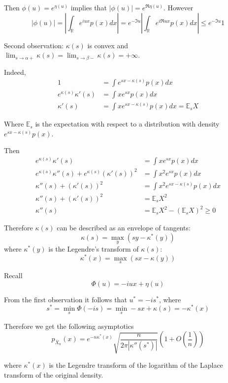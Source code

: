 \documentclass[a4paper]{article}
\newcommand{\brac}[1]{{\left ( #1 \right )}}
\newcommand{\abs}[1]{{\left | #1 \right |}}
\newcommand{\Real}{\mathbb{R}}
\newcommand{\ex}{\mathbb{E}}
\begin{document}
Then $\phi(u) = e^{\eta(u)}$ implies that $\abs{\phi(u)} = e^{\Re \eta(u)}$. However 
\[\abs{\phi(u)} = \abs{\int_\Real e^{iux} p(x) dx} = e^{-\Im u} \abs{ \int_\Real e^{i\Re u x} p(x) dx } \leq e^{-\Im u} 1 \]

Second observation: $\kappa(s)$ is convex and $\lim_{s\to \alpha+} \kappa(s) = \lim_{s\to \beta-} \kappa(s) = +\infty$.

Indeed, 
\begin{align*}
	1 &= \int e^{sx - \kappa(s)} p(x) dx \\
	e^{\kappa(s)} \kappa'(s) &= \int xe^{sx} p(x) dx \\
	\kappa'(s) &= \int xe^{sx - \kappa(s)} p(x) dx = \ex_s X
\end{align*}

Where $\ex_s$ is the expectation with respect to a distribution with density $e^{sx - \kappa(s)} p(x)$.

Then
\begin{align*}
	e^{\kappa(s)} \kappa'(s) &= \int xe^{sx} p(x) dx \\
	e^{\kappa(s)} \kappa''(s) + e^{\kappa(s)} \brac{\kappa'(s)}^2 &= \int x^2 e^{sx} p(x) dx \\
	\kappa''(s) + \brac{\kappa'(s)}^2 &= \int x^2 e^{sx-\kappa(s)} p(x) dx \\
	\kappa''(s) + \brac{\kappa'(s)}^2 &= \ex_s X^2 \\
	\kappa''(s) &= \ex_s X^2 - \brac{\ex_s X}^2\geq 0
\end{align*}

Therefore $\kappa(s)$ can be described as an envelope of tangents:
\[ \kappa(s) = \max_{y} \brac{sy - \kappa^*(y)} \]
where $\kappa^*(y)$ is the Legendre's transform of $\kappa(s)$:
\[ \kappa^*(x) = \max_{s} \brac{sx - \kappa(y)} \]

Recall 
\[\Phi(u) = - iux +\eta(u)\]

From the first observation it follows that $u^* = -is^*$, where
\[s^* = \min_{s}\Phi(-is) = \min_{s} -sx + \kappa(s) = - \kappa^*(x)\]

Therefore we get the following asymptotics
\[p_{\bar{X}_n}(x) = e^{-n\kappa^*(x)} \sqrt{\frac{n}{2\pi \abs{\kappa''(s^*)}}}\brac{1+O(\frac{1}{n})}\]

where $\kappa^*(x)$ is the Legendre transform of the logarithm of the Laplace transform of the original density.


\end{document}
